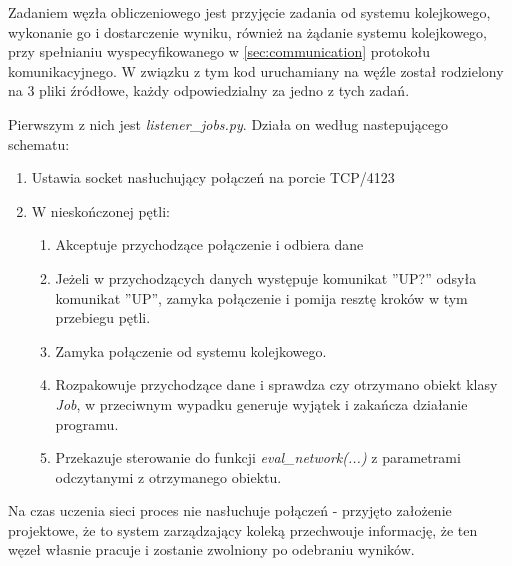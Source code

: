 Zadaniem węzła obliczeniowego jest przyjęcie zadania od systemu kolejkowego, wykonanie go i dostarczenie wyniku, również na żądanie systemu kolejkowego, przy spełnianiu wyspecyfikowanego w \ref{sec:communication} protokołu komunikacyjnego.
W związku z tym kod uruchamiany na węźle został rodzielony na 3 pliki źródłowe, każdy odpowiedzialny za jedno z tych zadań.

Pierwszym z nich jest \textit{listener\_jobs.py}.
Działa on według nastepującego schematu:
\begin{enumerate}
  \item Ustawia socket nasłuchujący połączeń na porcie TCP/4123
  \item W nieskończonej pętli:
  \begin{enumerate}
    \item Akceptuje przychodzące połączenie i odbiera dane
    \item Jeżeli w przychodzących danych występuje komunikat ''UP?'' odsyła komunikat ''UP'', zamyka połączenie i pomija resztę kroków w tym przebiegu pętli.
    \item Zamyka połączenie od systemu kolejkowego.
    \item Rozpakowuje przychodzące dane i sprawdza czy otrzymano obiekt klasy \textit{Job}, w przeciwnym wypadku generuje wyjątek i zakańcza działanie programu.
    \item Przekazuje sterowanie do funkcji \textit{eval\_network(...)} z parametrami odczytanymi z otrzymanego obiektu.
  \end{enumerate}
\end{enumerate}

Na czas uczenia sieci proces nie nasłuchuje połączeń - przyjęto założenie projektowe, że to system zarządzający koleką przechwouje informację, że ten węzeł własnie pracuje i zostanie zwolniony po odebraniu wyników.

